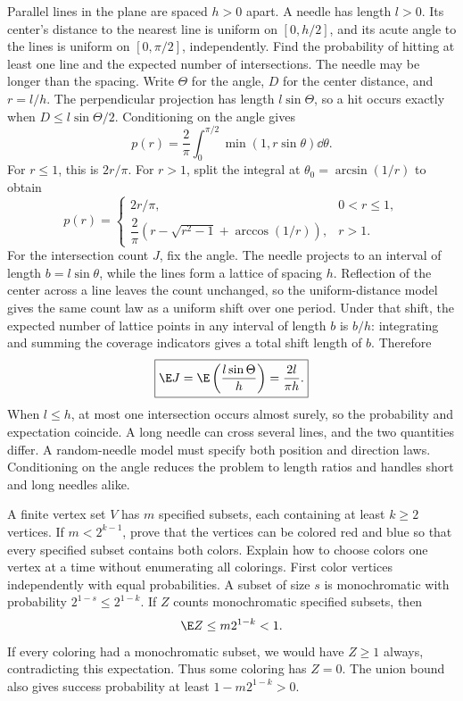Parallel lines in the plane are spaced $h>0$ apart. A needle has length $l>0$. Its center's distance to the nearest line is uniform on $[0,h/2]$, and its acute angle to the lines is uniform on $[0,\pi/2]$, independently. Find the probability of hitting at least one line and the expected number of intersections. The needle may be longer than the spacing.
\solution Write $\Theta$ for the angle, $D$ for the center distance, and $r=l/h$. The perpendicular projection has length $l\sin\Theta$, so a hit occurs exactly when $D\le l\sin\Theta/2$. Conditioning on the angle gives
\[
p(r)=\frac2\pi\int_0^{\pi/2}\min(1,r\sin\theta)\dd\theta.
\]
For $r\le1$, this is $2r/\pi$. For $r>1$, split the integral at $\theta_0=\arcsin(1/r)$ to obtain
\[
\boxed{p(r)=\begin{cases}
2r/\pi,&0<r\le1,\\
\dfrac2\pi\left(r-\sqrt{r^2-1}+\arccos(1/r)\right),&r>1.
\end{cases}}
\]
For the intersection count $J$, fix the angle. The needle projects to an interval of length $b=l\sin\theta$, while the lines form a lattice of spacing $h$. Reflection of the center across a line leaves the count unchanged, so the uniform-distance model gives the same count law as a uniform shift over one period. Under that shift, the expected number of lattice points in any interval of length $b$ is $b/h$: integrating and summing the coverage indicators gives a total shift length of $b$. Therefore
\[
\boxed{\E J=\E\left(\frac{l\sin\Theta}{h}\right)=\frac{2l}{\pi h}.}
\]
When $l\le h$, at most one intersection occurs almost surely, so the probability and expectation coincide. A long needle can cross several lines, and the two quantities differ.
\insight A random-needle model must specify both position and direction laws. Conditioning on the angle reduces the problem to length ratios and handles short and long needles alike.

A finite vertex set $V$ has $m$ specified subsets, each containing at least $k\ge2$ vertices. If $m<2^{k-1}$, prove that the vertices can be colored red and blue so that every specified subset contains both colors. Explain how to choose colors one vertex at a time without enumerating all colorings.
\solution First color vertices independently with equal probabilities. A subset of size $s$ is monochromatic with probability $2^{1-s}\le2^{1-k}$. If $Z$ counts monochromatic specified subsets, then
\[
\E Z\le m2^{1-k}<1.
\]
If every coloring had a monochromatic subset, we would have $Z\ge1$ always, contradicting this expectation. Thus some coloring has $Z=0$. The union bound also gives success probability at least $1-m2^{1-k}>0$.

